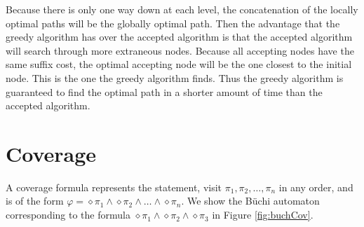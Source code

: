 Because there is only one way down at each level, the concatenation of the locally optimal paths will be the globally optimal path. Then the advantage that the greedy algorithm has over the accepted algorithm is that the accepted algorithm will search through more extraneous nodes. Because all accepting nodes have the same suffix cost, the optimal accepting node will be the one closest to the initial node. This is the one the greedy algorithm finds. Thus the greedy algorithm is guaranteed to find the optimal path in a shorter amount of time than the accepted algorithm.


\section{Coverage}
A coverage formula represents the statement, visit $\pi_1, \pi_2, \dots, \pi_n$ in any order, and is of the form $\varphi = \diamond \pi_1 \wedge \diamond \pi_2 \wedge \dots \wedge \diamond \pi_n$. We show the B\"uchi automaton corresponding to the formula $\diamond \pi_1 \wedge \diamond \pi_2 \wedge \diamond \pi_3$ in Figure \ref{fig:buchCov}.


